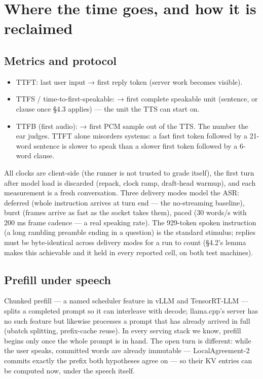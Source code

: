 \documentclass[journal]{IEEEtran}
\begin{document}
\section{Where the time goes, and how it is reclaimed}

\subsection{Metrics and protocol}


    \begin{itemize}
        \item TTFT: last user input → first reply token (server work becomes visible).
        \item TTFS / time-to-first-speakable: → first complete speakable unit (sentence, or clause once §4.3 applies) — the unit the TTS can start on.
        \item TTFB (first audio): → first PCM sample out of the TTS. The number the ear judges. TTFT alone misorders systems: a fast first token followed by a 21-word sentence is slower to speak than a slower first token followed by a 6-word clause.
    \end{itemize}

All clocks are client-side (the runner is not trusted to grade itself), the first turn after model load is discarded (repack, clock ramp, draft-head warmup), and each measurement is a fresh conversation. Three delivery modes model the ASR: deferred (whole instruction arrives at turn end — the no-streaming baseline), burst (frames arrive as fast as the socket takes them), paced (30 words/s with 200 ms frame cadence — a real speaking rate). The 929-token spoken instruction (a long rambling preamble ending in a question) is the standard stimulus; replies must be byte-identical across delivery modes for a run to count (§4.2's lemma makes this achievable and it held in every reported cell, on both test machines).

\subsection{Prefill under speech}

Chunked prefill — a named scheduler feature in vLLM and TensorRT-LLM — splits a completed prompt so it can interleave with decode; llama.cpp's server has no such feature but likewise processes a prompt that has already arrived in full (ubatch splitting, prefix-cache reuse). In every serving stack we know, prefill begins only once the whole prompt is in hand. The open turn is different: while the user speaks, committed words are already immutable — LocalAgreement-2 commits exactly the prefix both hypotheses agree on — so their KV entries can be computed now, under the speech itself.
\end{document}
